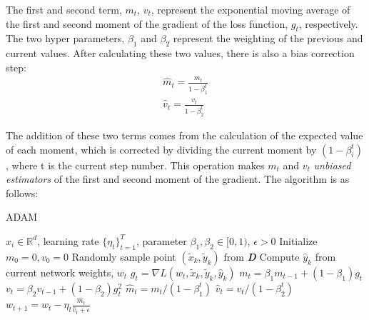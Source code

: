 The first and second term, $m_{t}$, $v_t$, represent the exponential moving average of the first and second moment of the gradient of the loss function, $g_t$, respectively. The two hyper parameters, $\beta_1$ and $\beta_2$ represent the weighting of the previous and current values. After calculating these two values, there is also a bias correction step:
\begin{align*}
\hat{m}_{t}=\frac{m_t}{1-\beta_1^t} \\
\hat{v}_{t}=\frac{v_t}{1-\beta_2^t}
\end{align*}
\vspace{-10pt}

The addition of these two terms comes from the calculation of the expected value of each moment, which is corrected by dividing the current moment by $(1 - \beta_i^t)$, where t is the current step number. This operation makes $m_t$ and $v_t$ \textit{unbiased estimators} of the first and second moment of the gradient. The algorithm is as follows:
\begin{minipage}[b]{.48\textwidth}
\begin{algorithm}[H]\small
	\caption{ADAM}
	\label{alg:adam}
	\begin{algorithmic}
		 $x_i \in \mathbb{R}^d$, learning rate $\{\eta_t\}_{t=1}^T$, parameter $\beta_{1},\beta_{2} \in [0,1)$,  $\epsilon > 0$
		\STATE Initialize $m_{0} = 0, v_{0} = 0$
		\vspace{2pt}
		\STATE Randomly sample point $(\tilde x_k,\tilde y_k)$ from \textbf{\textit{D}}
		\vspace{2pt}
		\STATE Compute $\hat y_k$ from current network weights, $w_t$
		\vspace{2pt}
		\STATE $g_{t} = \nabla L(w_t,\tilde x_{k},\tilde y_k,\hat y_k)$
		\vspace{2pt}
        \STATE $m_{t} = \beta_{1}m_{t-1}+(1-\beta_{1})g_{t}$
        \vspace{2pt}
        \STATE $v_{t} = \beta_{2}v_{t-1}+(1-\beta_{2})g_{t}^2$
        \vspace{2pt}
        \STATE $\hat{m}_{t}={m_t}/(1-\beta_1^t)$
        \vspace{2pt}
        \STATE $\hat{v}_{t}={v_t}/(1-\beta_2^t)$
        \vspace{2pt}
        \STATE $w_{t+1} = w_{t}-\eta_t\frac{\hat{m}_t}{\hat{v}_t+\epsilon}$
        \vspace{2pt}
		\ENDFOR
	\end{algorithmic}
\end{algorithm}
\end{minipage}\hfill%

